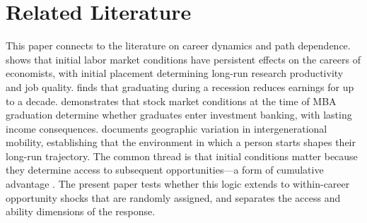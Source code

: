\section{Related Literature}
\label{sec:literature}

This paper connects to the literature on career dynamics and path dependence. \citet{Oyer2006_initial_placement} shows that initial labor market conditions have persistent effects on the careers of economists, with initial placement determining long-run research productivity and job quality. \citet{Oreopoulos2012_graduating_recession} finds that graduating during a recession reduces earnings for up to a decade. \citet{Oyer2008_investment_banker} demonstrates that stock market conditions at the time of MBA graduation determine whether graduates enter investment banking, with lasting income consequences. \citet{Chetty2014_where_is_land} documents geographic variation in intergenerational mobility, establishing that the environment in which a person starts shapes their long-run trajectory. The common thread is that initial conditions matter because they determine access to subsequent opportunities---a form of cumulative advantage \citep{Merton1968_matthew_effect}. The present paper tests whether this logic extends to within-career opportunity shocks that are randomly assigned, and separates the access and ability dimensions of the response.

